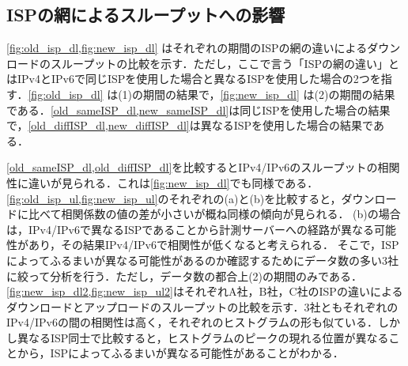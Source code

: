 \subsection{ISPの網によるスループットへの影響}
\label{subsec:isp_dl}
\cref{fig:old_isp_dl,fig:new_isp_dl} はそれぞれの期間のISPの網の違いによるダウンロードのスループットの比較を示す．ただし，ここで言う「ISPの網の違い」とはIPv4とIPv6で同じISPを使用した場合と異なるISPを使用した場合の2つを指す．\cref{fig:old_isp_dl} は(1)の期間の結果で，\cref{fig:new_isp_dl} は(2)の期間の結果である．\cref{old_sameISP_dl,new_sameISP_dl}は同じISPを使用した場合の結果で，\cref{old_diffISP_dl,new_diffISP_dl}は異なるISPを使用した場合の結果である．

\cref{old_sameISP_dl,old_diffISP_dl}を比較するとIPv4/IPv6のスループットの相関性に違いが見られる．これは\cref{fig:new_isp_dl}でも同様である．\cref{fig:old_isp_ul,fig:new_isp_ul}のそれぞれの(a)と(b)を比較すると，ダウンロードに比べて相関係数の値の差が小さいが概ね同様の傾向が見られる．
(b)の場合は，IPv4/IPv6で異なるISPであることから計測サーバーへの経路が異なる可能性があり，その結果IPv4/IPv6で相関性が低くなると考えられる．
そこで，ISPによってふるまいが異なる可能性があるのか確認するためにデータ数の多い3社に絞って分析を行う．ただし，データ数の都合上(2)の期間のみである．\cref{fig:new_isp_dl2,fig:new_isp_ul2}はそれぞれA社，B社，C社のISPの違いによるダウンロードとアップロードのスループットの比較を示す．3社ともそれぞれのIPv4/IPv6の間の相関性は高く，それぞれのヒストグラムの形も似ている．しかし異なるISP同士で比較すると，ヒストグラムのピークの現れる位置が異なることから，ISPによってふるまいが異なる可能性があることがわかる．

